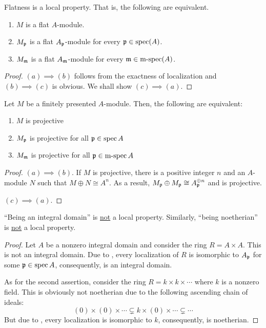 \begin{proposition}
    Flatness is a local property. That is, the following are equivalent.
    \begin{enumerate}[label=(\alph*)]
        \item $M$ is a flat $A$-module. 
        \item $M_\mathfrak p$ is a flat $A_\mathfrak p$-module for every $\mathfrak p\in\operatorname{spec}(A)$. 
        \item $M_\mathfrak m$ is a flat $A_\mathfrak m$-module for every $\mathfrak m\in\operatorname{m-spec}(A)$.
    \end{enumerate}
\end{proposition}
\begin{proof}
    $(a)\implies(b)$ follows from the exactness of localization and $(b)\implies(c)$ is obvious. We shall show $(c)\implies(a)$.
\end{proof}

\begin{proposition}
    Let $M$ be a finitely presented $A$-module. Then, the following are equivalent: 
    \begin{enumerate}[label=(\alph*)]
        \item $M$ is projective
        \item $M_\mathfrak p$ is projective for all $\mathfrak p\in\operatorname{spec} A$ 
        \item $M_\mathfrak m$ is projective for all $\mathfrak p\in\operatorname{m-spec} A$ 
    \end{enumerate}
\end{proposition}
\begin{proof}
    $(a)\implies(b)$. If $M$ is projective, there is a positive integer $n$ and an $A$-module $N$ such that $M\oplus N\cong A^n$. As a result, $M_\mathfrak p\oplus M_\mathfrak p\cong A_\mathfrak p^{\oplus n}$ and is projective. 

    $(c)\implies(a)$. 
\end{proof}

\begin{proposition}
    ``Being an integral domain'' is \underline{not} a local property. Similarly, ``being noetherian'' is \underline{not} a local property.
\end{proposition}
\begin{proof}
    Let $A$ be a nonzero integral domain and consider the ring $R = A\times A$. This is not an integral domain. Due to , every localization of $R$ is isomorphic to $A_{\mathfrak p}$ for some $\mathfrak p\in\operatorname{spec} A$, consequently, is an integral domain. 

    As for the second assertion, consider the ring $R = k\times k\times\cdots$ where $k$ is a nonzero field. This is obviously not noetherian due to the following ascending chain of ideals: 
    \begin{equation*}
        (0)\times(0)\times\cdots\subsetneq k\times(0)\times\cdots\subsetneq\cdots
    \end{equation*}
    But due to , every localization is isomorphic to $k$, consequently, is noetherian.
\end{proof}

